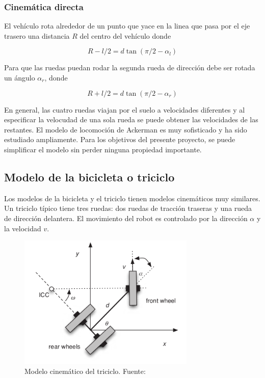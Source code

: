         \subsubsection{Cinemática directa}
        El vehículo rota alrededor de un punto que yace en la linea que pasa por el eje trasero una distancia $R$ del centro 
        del vehículo donde

        \begin{equation*}
            R - l/2 = d \tan{(\pi / 2 - \alpha_l)}
        \end{equation*}

        Para que las ruedas puedan rodar la segunda rueda de dirección debe ser rotada un ángulo $\alpha_r$, donde 

        \begin{equation*}
            R + l/2 = d \tan{(\pi / 2 - \alpha_r)}
        \end{equation*}

        En general, las cuatro ruedas viajan por el suelo a velocidades diferentes y al especificar la velocudad de una sola rueda
        se puede obtener las velocidades de las restantes. El modelo de locomoción de Ackerman es muy sofisticado y ha sido 
        estudiado ampliamente. Para los objetivos del presente proyecto, se puede simplificar el modelo sin perder ninguna 
        propiedad importante.

    \subsection{Modelo de la bicicleta o triciclo} \label{sec:triciclo}
    Los modelos de la bicicleta y el triciclo tienen modelos cinemáticos muy similares. Un triciclo típico tiene tres ruedas: 
    dos ruedas de tracción traseras y una rueda de dirección delantera. El movimiento del robot es controlado por la dirección 
    $\alpha$ y la velocidad $v$.
    \begin{figure}[!h] 
        \centering
        \includegraphics[width=0.75\textwidth]{img/triciclo}
        \caption{Modelo cinemático del triciclo. Fuente: \cite{GregoryMcGillUniversity2010} }
        \label{fig:triciclo}
    \end{figure}    

